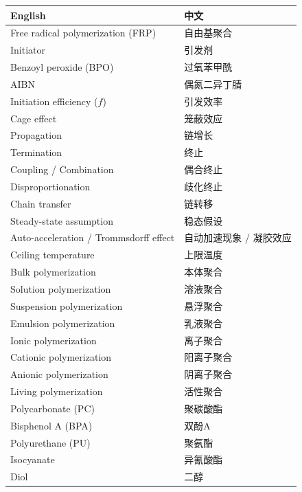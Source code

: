 \documentclass[12pt,a4paper]{ctexart}
\begin{document}
\begin{longtable}{p{5.5cm}p{5.5cm}}
\toprule
\textbf{English} & \textbf{中文} \\
\midrule
Free radical polymerization (FRP) & 自由基聚合 \\
Initiator & 引发剂 \\
Benzoyl peroxide (BPO) & 过氧苯甲酰 \\
AIBN & 偶氮二异丁腈 \\
Initiation efficiency ($f$) & 引发效率 \\
Cage effect & 笼蔽效应 \\
Propagation & 链增长 \\
Termination & 终止 \\
Coupling / Combination & 偶合终止 \\
Disproportionation & 歧化终止 \\
Chain transfer & 链转移 \\
Steady-state assumption & 稳态假设 \\
Auto-acceleration / Trommsdorff effect & 自动加速现象 / 凝胶效应 \\
Ceiling temperature & 上限温度 \\
Bulk polymerization & 本体聚合 \\
Solution polymerization & 溶液聚合 \\
Suspension polymerization & 悬浮聚合 \\
Emulsion polymerization & 乳液聚合 \\
Ionic polymerization & 离子聚合 \\
Cationic polymerization & 阳离子聚合 \\
Anionic polymerization & 阴离子聚合 \\
Living polymerization & 活性聚合 \\
Polycarbonate (PC) & 聚碳酸酯 \\
Bisphenol A (BPA) & 双酚A \\
Polyurethane (PU) & 聚氨酯 \\
Isocyanate & 异氰酸酯 \\
Diol & 二醇 \\
\bottomrule
\end{longtable}
\end{document}
